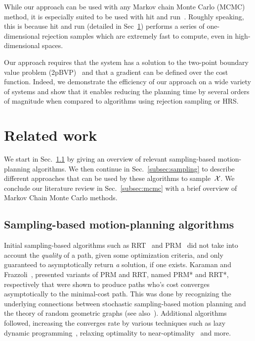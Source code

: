 \documentclass[letterpaper, 10 pt, conference]{ieeeconf}  %
\begin{document}
While our approach can be used with any Markov chain Monte Carlo (MCMC) method, it is especially suited to be used with hit and run~\cite{S84,KSZ11}.
Roughly speaking, this is because hit and run (detailed in Sec~\ref{sec:related_work})
performs a series of one-dimensional rejection samples which are extremely fast to compute, even in high-dimensional spaces. 

Our approach requires that the system has a solution to the two-point boundary value problem (2pBVP)~\cite{L06, H02} and that a gradient can be defined over the cost function.
Indeed, we demonstrate the efficiency of our approach on a wide variety of systems and show that it enables reducing the planning time by several orders of magnitude when compared to algorithms using rejection sampling or HRS.


\section{Related work}
\label{sec:related_work}
We start in Sec.~\ref{subsec:planning} by giving an overview of relevant sampling-based motion-planning algorithms.
We then continue in Sec.~\ref{subsec:sampling} to describe different approaches that can be used by  these algorithms to sample~$\mathcal{X}$.
We conclude our literature review in Sec.~\ref{subsec:mcmc} with a brief overview of Markov Chain Monte Carlo methods.

\subsection{Sampling-based motion-planning algorithms}
\label{subsec:planning}
Initial sampling-based algorithms such as RRT~\cite{LK01} and PRM~\cite{KSLO96} did not take into account the \emph{quality} of a path, given some optimization criteria, and only guaranteed to asymptotically return \emph{a} solution, if one exists.
Karaman and Frazzoli~\cite{KF11}, presented variants of PRM and RRT, named PRM* and RRT*, respectively that were shown to produce paths who's cost converges asymptotically to the minimal-cost path.
This was done by recognizing the underlying connections between stochastic sampling-based motion planning and the theory of random geometric graphs (see also~\cite{SSH16}).
Additional algorithms followed, increasing the converges rate by various techniques such as 
lazy dynamic programming~\cite{GSB15, JSCP15, SH15},
relaxing optimality to near-optimality~\cite{DB14, SH16} 
and more.
\end{document}
